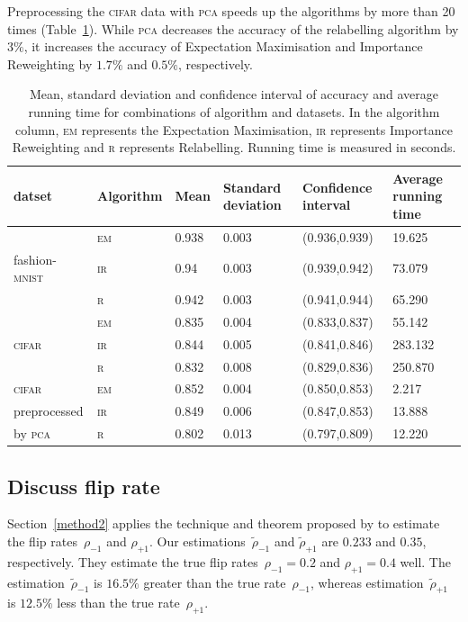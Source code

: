 \documentclass[12pt]{article} %
\newcommand{\rhoo}{\rho_{+1}}
\newcommand{\rhoz}{\rho_{-1}}
\newcommand{\mnist}{fashion-\textsc{mnist}}
\begin{document}
Preprocessing the \textsc{cifar} data with \textsc{pca} speeds up the algorithms by more than 20 times (Table~\ref{tab:Meansd}). While  \textsc{pca} decreases the accuracy of the relabelling algorithm by $3\%$, it increases the accuracy of Expectation Maximisation and Importance Reweighting  by $1.7\%$ and $0.5\%$, respectively. 
\begin{table}
	\caption{Mean, standard deviation and confidence interval of accuracy and average running time for combinations of algorithm and datasets. In the algorithm column, \textsc{em} represents the Expectation Maximisation, \textsc{ir} represents Importance Reweighting and \textsc{r} represents Relabelling. Running time is measured in seconds.}
	\label{tab:Meansd}
\centering
\begin{tabular}{@{}llllll@{}}
\toprule
datset& Algorithm&Mean  & Standard deviation & Confidence interval & Average running time \\ \midrule
&\textsc{em}&0.938 & 0.003              & (0.936,0.939)     & 19.625\\
\mnist\ &\textsc{ir}&0.94  & 0.003              & (0.939,0.942)     & 73.079\\
&\textsc{r}&0.942 & 0.003              & (0.941,0.944)     & 65.290\\
\midrule
&\textsc{em}&0.835 & 0.004              & (0.833,0.837)     & 55.142\\
\textsc{cifar}&\textsc{ir}&0.844 & 0.005              & (0.841,0.846)     & 283.132\\
  &\textsc{r}&0.832 & 0.008              & (0.829,0.836)     & 250.870\\ 
\midrule
\textsc{cifar}&\textsc{em}&0.852 & 0.004              & (0.850,0.853)     & 2.217\\
 preprocessed&\textsc{ir}& 0.849 & 0.006              & (0.847,0.853)     & 13.888\\
 by \textsc{pca}  &\textsc{r}& 0.802 & 0.013              & (0.797,0.809)     & 12.220\\ 
\bottomrule
\end{tabular}
\end{table}



\subsection{Discuss flip rate}

Section~\ref{method2} applies the technique and theorem proposed by \citet{liu2016classification} to estimate the flip rates~$\rhoz$ and $\rhoo$. Our estimations~$\tilde{\rho}_{-1}$ and $\tilde{\rho}_{+1}$ are $0.233$ and $0.35$, respectively. They estimate the true flip rates~$\rhoz=0.2$ and $\rhoo=0.4$ well. 
The estimation~$\tilde{\rho}_{-1}$ is $16.5\%$ greater than the true rate~$\rhoz$, whereas estimation~$\tilde{\rho}_{+1}$ is $12.5\%$ less than  the true rate~$\rhoo$.
\end{document}
